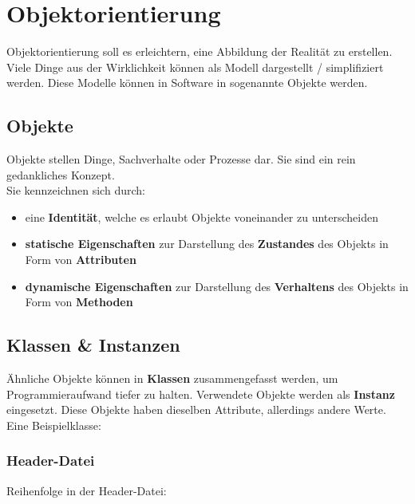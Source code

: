 \section{Objektorientierung}

Objektorientierung soll es erleichtern, eine Abbildung der Realität zu erstellen. 
Viele Dinge aus der Wirklichkeit können als Modell dargestellt / simplifiziert werden. 
Diese Modelle können in Software in sogenannte Objekte  werden.

\subsection{Objekte}

Objekte stellen Dinge, Sachverhalte oder Prozesse dar. Sie sind ein rein gedankliches Konzept.\\
Sie kennzeichnen sich durch:

\begin{itemize}[itemsep=1pt, parsep=0pt]
    \item eine \textbf{Identität}, welche es erlaubt Objekte voneinander zu unterscheiden
    \item \textbf{statische Eigenschaften} zur Darstellung des \textbf{Zustandes} des Objekts in Form von \textbf{Attributen}
    \item \textbf{dynamische Eigenschaften} zur Darstellung des \textbf{Verhaltens} des Objekts in Form von \textbf{Methoden}
\end{itemize}


\subsection{Klassen \& Instanzen}

Ähnliche Objekte können in \textbf{Klassen} zusammengefasst werden, um Programmieraufwand tiefer zu halten. 
Verwendete Objekte werden als \textbf{Instanz} eingesetzt. Diese Objekte haben dieselben Attribute, allerdings andere Werte.\\
Eine Beispielklasse:\\



\subsubsection{Header-Datei}

Reihenfolge in der Header-Datei:

